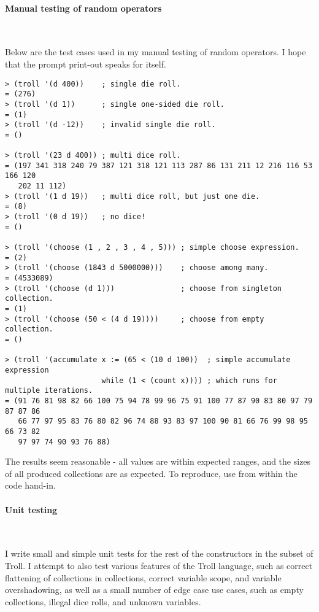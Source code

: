 \paragraph{Manual testing of random operators}~\smallskip

Below are the test cases used in my manual testing of random operators. I hope
that the prompt print-out speaks for itself.

\begin{verbatim}
> (troll '(d 400))    ; single die roll.
= (276)               
> (troll '(d 1))      ; single one-sided die roll.
= (1)                 
> (troll '(d -12))    ; invalid single die roll.
= ()

> (troll '(23 d 400)) ; multi dice roll.
= (197 341 318 240 79 387 121 318 121 113 287 86 131 211 12 216 116 53 166 120 
   202 11 112)
> (troll '(1 d 19))   ; multi dice roll, but just one die.
= (8)
> (troll '(0 d 19))   ; no dice!
= ()

> (troll '(choose (1 , 2 , 3 , 4 , 5))) ; simple choose expression.
= (2)
> (troll '(choose (1843 d 5000000)))    ; choose among many.
= (4533089)                             
> (troll '(choose (d 1)))               ; choose from singleton collection.
= (1)                                   
> (troll '(choose (50 < (4 d 19))))     ; choose from empty collection.
= ()

> (troll '(accumulate x := (65 < (10 d 100))  ; simple accumulate expression
                      while (1 < (count x)))) ; which runs for multiple iterations.
= (91 76 81 98 82 66 100 75 94 78 99 96 75 91 100 77 87 90 83 80 97 79 87 87 86
   66 77 97 95 83 76 80 82 96 74 88 93 83 97 100 90 81 66 76 99 98 95 66 73 82
   97 97 74 90 93 76 88)
\end{verbatim}

The results seem reasonable - all values are within expected ranges, and the
sizes of all produced collections are as expected. To reproduce, use  from within the code hand-in.

\paragraph{Unit testing}~\smallskip

I write small and simple unit tests for the rest of the constructors in the
subset of Troll. I attempt to also test various features of the Troll language,
such as correct flattening of collections in collections, correct variable
scope, and variable overshadowing, as well as a small number of edge case use
cases, such as empty collections, illegal dice rolls, and unknown variables.

